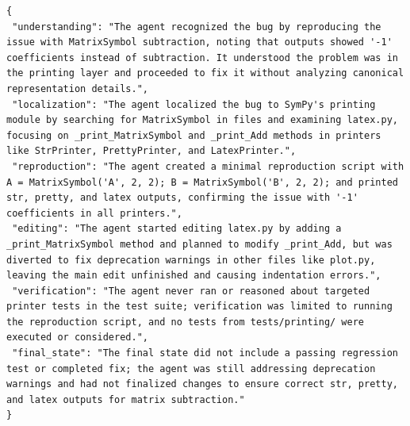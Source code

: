 \documentclass[10pt,twocolumn]{article}
\begin{document}
\begin{lstlisting}
{
 "understanding": "The agent recognized the bug by reproducing the issue with MatrixSymbol subtraction, noting that outputs showed '-1' coefficients instead of subtraction. It understood the problem was in the printing layer and proceeded to fix it without analyzing canonical representation details.",
 "localization": "The agent localized the bug to SymPy's printing module by searching for MatrixSymbol in files and examining latex.py, focusing on _print_MatrixSymbol and _print_Add methods in printers like StrPrinter, PrettyPrinter, and LatexPrinter.",
 "reproduction": "The agent created a minimal reproduction script with A = MatrixSymbol('A', 2, 2); B = MatrixSymbol('B', 2, 2); and printed str, pretty, and latex outputs, confirming the issue with '-1' coefficients in all printers.",
 "editing": "The agent started editing latex.py by adding a _print_MatrixSymbol method and planned to modify _print_Add, but was diverted to fix deprecation warnings in other files like plot.py, leaving the main edit unfinished and causing indentation errors.",
 "verification": "The agent never ran or reasoned about targeted printer tests in the test suite; verification was limited to running the reproduction script, and no tests from tests/printing/ were executed or considered.",
 "final_state": "The final state did not include a passing regression test or completed fix; the agent was still addressing deprecation warnings and had not finalized changes to ensure correct str, pretty, and latex outputs for matrix subtraction."
}
\end{lstlisting}
\end{document}
